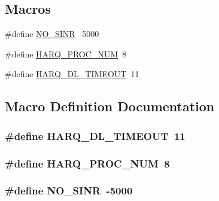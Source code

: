\subsection*{Macros}
\begin{DoxyCompactItemize}
\item 
\#define \hyperlink{fdbet-ff-mac-scheduler_8h_a520d71777be043568160c783a9c65fd5}{N\+O\+\_\+\+S\+I\+NR}~-\/5000
\item 
\#define \hyperlink{fdbet-ff-mac-scheduler_8h_a9185d8d7d2b2979181d4a7044a3d3555}{H\+A\+R\+Q\+\_\+\+P\+R\+O\+C\+\_\+\+N\+UM}~8
\item 
\#define \hyperlink{fdbet-ff-mac-scheduler_8h_add9e0c4889dc1b5b25686480b31ad166}{H\+A\+R\+Q\+\_\+\+D\+L\+\_\+\+T\+I\+M\+E\+O\+UT}~11
\end{DoxyCompactItemize}


\subsection{Macro Definition Documentation}
\subsubsection[{\texorpdfstring{H\+A\+R\+Q\+\_\+\+D\+L\+\_\+\+T\+I\+M\+E\+O\+UT}{HARQ_DL_TIMEOUT}}]{\setlength{\rightskip}{0pt plus 5cm}\#define H\+A\+R\+Q\+\_\+\+D\+L\+\_\+\+T\+I\+M\+E\+O\+UT~11}\hypertarget{fdbet-ff-mac-scheduler_8h_add9e0c4889dc1b5b25686480b31ad166}{}\label{fdbet-ff-mac-scheduler_8h_add9e0c4889dc1b5b25686480b31ad166}
\subsubsection[{\texorpdfstring{H\+A\+R\+Q\+\_\+\+P\+R\+O\+C\+\_\+\+N\+UM}{HARQ_PROC_NUM}}]{\setlength{\rightskip}{0pt plus 5cm}\#define H\+A\+R\+Q\+\_\+\+P\+R\+O\+C\+\_\+\+N\+UM~8}\hypertarget{fdbet-ff-mac-scheduler_8h_a9185d8d7d2b2979181d4a7044a3d3555}{}\label{fdbet-ff-mac-scheduler_8h_a9185d8d7d2b2979181d4a7044a3d3555}
\subsubsection[{\texorpdfstring{N\+O\+\_\+\+S\+I\+NR}{NO_SINR}}]{\setlength{\rightskip}{0pt plus 5cm}\#define N\+O\+\_\+\+S\+I\+NR~-\/5000}\hypertarget{fdbet-ff-mac-scheduler_8h_a520d71777be043568160c783a9c65fd5}{}\label{fdbet-ff-mac-scheduler_8h_a520d71777be043568160c783a9c65fd5}
